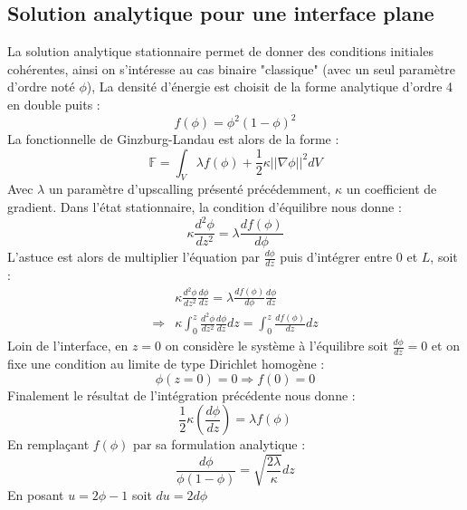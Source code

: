 \begin{appendix}
\chapter{Solution analytique pour une interface plane}
La solution analytique stationnaire permet de donner des conditions initiales cohérentes, ainsi on s'intéresse au cas binaire "classique" (avec un seul paramètre d'ordre noté $\phi$), La densité d'énergie est choisit de la forme analytique d'ordre 4 en double puits :
\begin{equation}
	f(\phi) = \phi^2 (1-\phi)^2
\end{equation}
La fonctionnelle de Ginzburg-Landau est alors de la forme :
\begin{equation}
	\mathbb{F} =\int_V \lambda f(\phi) + \frac{1}{2}\kappa ||\nabla \phi||^2 dV
\end{equation}
Avec $\lambda$ un paramètre d'upscalling présenté précédemment, $\kappa$ un coefficient de gradient.
Dans l'état stationnaire, la condition d'équilibre nous donne :
\begin{equation}
	\kappa \frac{d^2\phi}{dz^2} = \lambda \frac{d f(\phi)}{d\phi}
\end{equation}
L'astuce est alors de multiplier l'équation par $\displaystyle \frac{d\phi}{dz}$ puis d'intégrer entre 0 et $L$, soit :
\begin{align}
	& \kappa \frac{d^2\phi}{dz^2}\frac{d\phi}{dz} = \lambda \frac{d f(\phi)}{d\phi}\frac{d\phi}{dz} \\
	\Rightarrow & \kappa \int_0^z \frac{d^2\phi}{dz^2}\frac{d\phi}{dz} dz= \int_0^z \frac{d f(\phi)}{dz} dz
\end{align}
Loin de l'interface, en $z=0$ on considère le système à l'équilibre soit $\frac{d\phi}{dz} = 0$ et on fixe une condition au limite de type Dirichlet homogène :
\begin{equation}
	\phi (z= 0) = 0 \Rightarrow f(0) = 0
\end{equation}
Finalement le résultat de l'intégration précédente nous donne :
\begin{equation}
		\frac{1}{2}\kappa \left(\frac{d\phi}{dz}\right) = \lambda f(\phi)
\end{equation}
En remplaçant $f(\phi)$ par sa formulation analytique : 
\begin{equation}
	\frac{d\phi}{\phi(1-\phi)} = \sqrt{\frac{2\lambda}{\kappa}} dz
	\label{solution_statio_plane}
\end{equation}
En posant $u = 2\phi - 1$ soit $du = 2d\phi$

\end{appendix}
